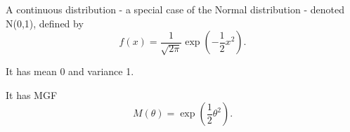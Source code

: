  A continuous distribution - a special case of the
Normal distribution - denoted N(0,1), defined by
\[ f(x) = \frac{1}{\sqrt{2 \pi}} \exp 
\left ( - \frac{1}{2} x ^2 \right ) . \]
\par
It has mean 0 and variance 1.
\par
It has MGF 
\[ M( \theta ) = \exp ( \frac{1}{2}  \theta ^2 ) .\]

